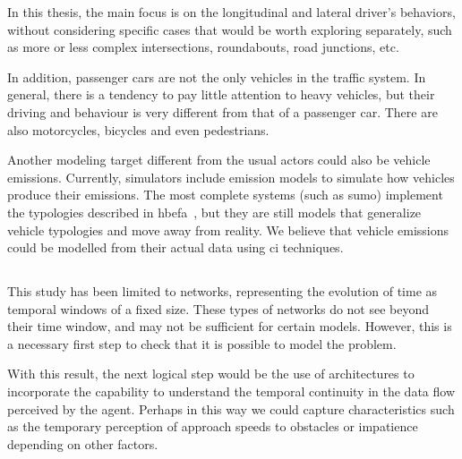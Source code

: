 In this thesis, the main focus is  on the longitudinal and lateral driver's behaviors, without considering specific cases that would be worth exploring separately, such as more or less complex intersections, roundabouts, road junctions, etc.

In addition, passenger cars are not the only vehicles in the traffic system. In general, there is a tendency to pay little attention to heavy vehicles, but their driving and behaviour is very different from that of a passenger car. There are also motorcycles, bicycles and even pedestrians.

Another modeling target different from the usual actors could also be vehicle emissions. Currently, simulators include emission models to simulate how vehicles produce their emissions. The most complete systems (such as \gls{sumo}) implement the typologies described in \gls{hbefa}~\cite{de2004modelling}, but they are still models that generalize vehicle typologies and move away from reality. We believe that vehicle emissions could be modelled from their actual data using \acrlong{ci} techniques.

\subsection{}

This study has been limited to \textit{} networks, representing the evolution of time as temporal windows of a fixed size. These types of networks do not see beyond their time window, and may not be sufficient for certain models. However, this is a necessary first step to check that it is possible to model the problem.

With this result, the next logical step would be the use of  architectures to incorporate the capability to understand the temporal continuity in the data flow perceived by the agent. Perhaps in this way we could capture characteristics such as the temporary perception of approach speeds to obstacles or impatience depending on other factors.